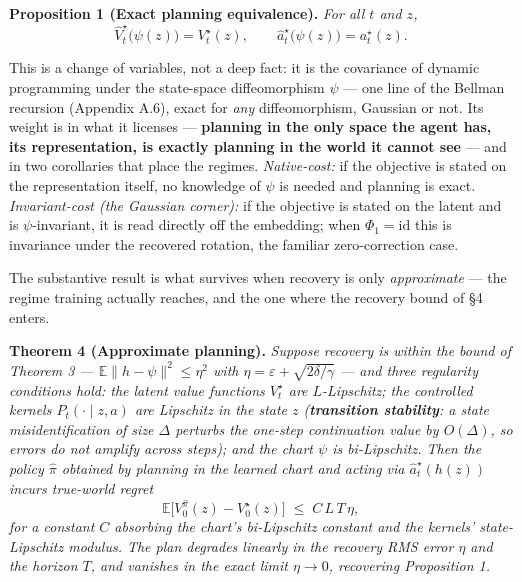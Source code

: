 \documentclass[
  letterpaper,
  11pt]{article}
\theoremstyle{plain}
\theoremstyle{definition}
\theoremstyle{remark}
\begin{document}
\textbf{Proposition 1 (Exact planning equivalence).} \emph{For all \(t\) and \(z\),}
\[\widehat V^\star_t\big(\psi(z)\big) = V^\star_t(z), \qquad \widehat a^\star_t\big(\psi(z)\big) = a^\star_t(z).\]

This is a change of variables, not a deep fact: it is the covariance of dynamic programming under the state-space diffeomorphism \(\psi\) --- one line of the Bellman recursion (Appendix A.6), exact for \emph{any} diffeomorphism, Gaussian or not. Its weight is in what it licenses --- \textbf{planning in the only space the agent has, its representation, is exactly planning in the world it cannot see} --- and in two corollaries that place the regimes. \emph{Native-cost:} if the objective is stated on the representation itself, no knowledge of \(\psi\) is needed and planning is exact. \emph{Invariant-cost (the Gaussian corner):} if the objective is stated on the latent and is \(\psi\)-invariant, it is read directly off the embedding; when \(\Phi_1=\mathrm{id}\) this is invariance under the recovered rotation, the familiar zero-correction case.

The substantive result is what survives when recovery is only \emph{approximate} --- the regime training actually reaches, and the one where the recovery bound of §4 enters.

\textbf{Theorem 4 (Approximate planning).} \emph{Suppose recovery is within the bound of Theorem 3 --- \(\mathbb E\|h-\psi\|^2 \le \eta^2\) with \(\eta = \varepsilon+\sqrt{2\delta/\gamma}\) --- and three regularity conditions hold: the latent value functions \(V^\star_t\) are \(L\)-Lipschitz; the controlled kernels \(P_t(\cdot\mid z,a)\) are Lipschitz in the state \(z\) (\textbf{transition stability}: a state misidentification of size \(\Delta\) perturbs the one-step continuation value by \(O(\Delta)\), so errors do not amplify across steps); and the chart \(\psi\) is bi-Lipschitz. Then the policy \(\hat\pi\) obtained by planning in the learned chart and acting via \(\widehat a^\star_t(h(z))\) incurs true-world regret}
\[\mathbb E\big[V^{\hat\pi}_0(z) - V^\star_0(z)\big] \;\le\; C\,L\,T\,\eta,\]
\emph{for a constant \(C\) absorbing the chart's bi-Lipschitz constant and the kernels' state-Lipschitz modulus. The plan degrades linearly in the recovery RMS error \(\eta\) and the horizon \(T\), and vanishes in the exact limit \(\eta\to 0\), recovering Proposition 1.}
\end{document}
